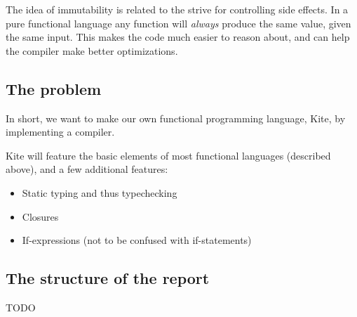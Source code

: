The idea of immutability is related to the strive for controlling side effects. In a pure functional language any function will \emph{always} produce the same value, given the same input. This makes the code much easier to reason about, and can help the compiler make better optimizations.

\subsection{The problem}
In short, we want to make our own functional programming language, Kite, by implementing a compiler.


Kite will feature the basic elements of most functional languages (described above), and a few additional features:

\begin{itemize}

\item Static typing and thus typechecking
\item Closures
\item If-expressions (not to be confused with if-statements)

\end{itemize}

\subsection{The structure of the report}
TODO
